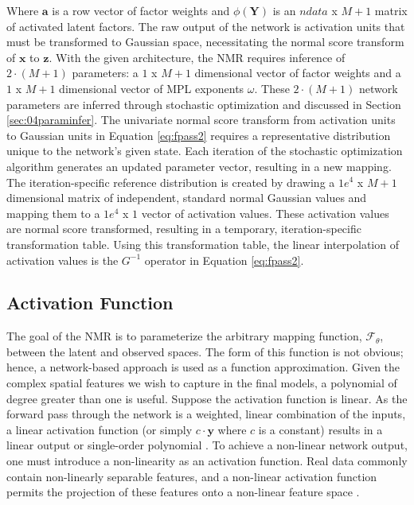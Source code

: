 Where $\mathbf{a}$ is a row vector of factor weights and $\phi\left(\mathbf{Y} \right)$ is an $ndata$ x $M+1$ matrix of activated latent factors. The raw output of the network is activation units that must be transformed to Gaussian space, necessitating the normal score transform of $\mathbf{x}$ to $\mathbf{z}$. With the given architecture, the \gls{NMR} requires inference of $2 \cdot (M+1)$ parameters: a $1$ x $M+1$ dimensional vector of factor weights and a $1$ x $M+1$ dimensional vector of \gls{MPL} exponents $\omega$. These $2 \cdot (M+1)$ network parameters are inferred through stochastic optimization and discussed in Section \ref{sec:04paraminfer}. The univariate normal score transform from activation units to Gaussian units in Equation \ref{eq:fpass2} requires a representative distribution unique to the network's given state. Each iteration of the stochastic optimization algorithm generates an updated parameter vector, resulting in a new mapping. The iteration-specific reference distribution is created by drawing a $1e^{4}$ x $M+1$ dimensional matrix of independent, standard normal Gaussian values and mapping them to a $1e^{4}$ x $1$ vector of activation values. These activation values are normal score transformed, resulting in a temporary, iteration-specific transformation table. Using this transformation table, the linear interpolation of activation values is the $G^{-1}$ operator in Equation \ref{eq:fpass2}.

\subsection{Activation Function}
\label{subsec:04activation}

The goal of the \gls{NMR} is to parameterize the arbitrary mapping function, $\mathcal{F}_{\theta}$, between the latent and observed spaces. The form of this function is not obvious; hence, a network-based approach is used as a function approximation. Given the complex spatial features we wish to capture in the final models, a polynomial of degree greater than one is useful. Suppose the activation function is linear. As the forward pass through the network is a weighted, linear combination of the inputs, a linear activation function (or simply $c \cdot \mathbf{y}$ where $c$ is a constant) results in a linear output or single-order polynomial \citep{sharma2020activation}. To achieve a non-linear network output, one must introduce a non-linearity as an activation function. Real data commonly contain non-linearly separable features, and a non-linear activation function permits the projection of these features onto a non-linear feature space \citep{dubey2022activation}.


